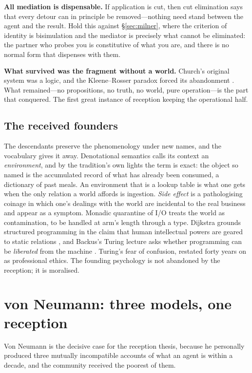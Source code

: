 \documentclass[11pt,a4paper]{article}
\begin{document}
\textbf{All mediation is dispensable.} If application is cut, then cut
elimination says that every detour can in principle be removed---nothing need
stand between the agent and the result. Hold this against
\S\ref{sec:milner}, where the criterion of identity is bisimulation and the
mediator is precisely what cannot be eliminated: the partner who probes you is
constitutive of what you are, and there is no normal form that dispenses with
them.

\textbf{What survived was the fragment without a world.} Church's original system
was a logic, and the Kleene--Rosser paradox forced its abandonment
\cite{kleenerosser1935}. What remained---no propositions, no truth, no
world, pure operation---is the part that conquered. The first great instance of
reception keeping the operational half.

\subsection{The received founders}

The descendants preserve the phenomenology under new names, and the vocabulary
gives it away. Denotational semantics calls its context an \emph{environment},
and by the tradition's own lights the term is exact: the object so named is the
accumulated record of what has already been consumed, a dictionary of past meals.
An environment that is a lookup table is what one gets when the only relation a
world affords is ingestion. \emph{Side effect} is a pathologising coinage in which one's
dealings with the world are incidental to the real business and appear as a
symptom. Monadic quarantine of I/O treats the world as contamination, to be
handled at arm's length through a type. Dijkstra grounds structured programming in
the claim that human intellectual powers are geared to static relations
\cite{dijkstra1968,dijkstra1972}, and Backus's Turing lecture asks whether
programming can be \emph{liberated} from the machine \cite{backus1978}. Turing's
fear of confusion, restated forty years on as professional ethics. The founding
psychology is not abandoned by the reception; it is moralised.

\section{von Neumann: three models, one reception}
\label{sec:vn}

Von Neumann is the decisive case for the reception thesis, because he personally
produced three mutually incompatible accounts of what an agent is within a
decade, and the community received the poorest of them.
\end{document}
